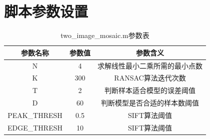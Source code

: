 \documentclass[a4paper, UTF8]{ctexrep}
\begin{document}
  \section{脚本参数设置}
	\begin{table}[htbp!]
	\centering
	\begin{tabular}{ccc}
	\hline
	参数名称 & 参数值 & 参数含义 \\
	\hline
	N & 4 & 求解线性最小二乘所需的最小点数 \\
	K & 300 & RANSAC算法迭代次数 \\
	T & 2 & 判断样本适合模型的误差阈值 \\
	D & 60 & 判断模型是否合适的样本数阈值 \\
	PEAK\_THRESH & 0.5 & SIFT算法阈值 \\
	EDGE\_THRESH & 10 & SIFT算法阈值 \\
	\hline
	\end{tabular}
	\caption{two\_image\_mosaic.m参数表}
	\end{table}
\end{document}
